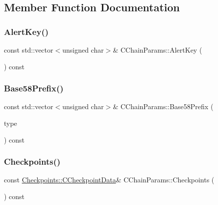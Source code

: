 \subsection{Member Function Documentation}
\mbox{\label{class_c_chain_params_a8ca8fe289d1c3d5851d6aebaf28db22f}} 
\subsubsection{\texorpdfstring{Alert\+Key()}{AlertKey()}}
{\footnotesize\ttfamily const std\+::vector$<$unsigned char$>$\& C\+Chain\+Params\+::\+Alert\+Key (\begin{DoxyParamCaption}{ }\end{DoxyParamCaption}) const\hspace{0.3cm}{\ttfamily [inline]}}

\mbox{\label{class_c_chain_params_a103c58eca4a26a71201882b3ed6c4cb4}} 
\subsubsection{\texorpdfstring{Base58\+Prefix()}{Base58Prefix()}}
{\footnotesize\ttfamily const std\+::vector$<$unsigned char$>$\& C\+Chain\+Params\+::\+Base58\+Prefix (\begin{DoxyParamCaption}\item[{\mbox{\hyperlink{class_c_chain_params_aa294058ec2e3586bd8d03d6c39667058}{Base58\+Type}}}]{type }\end{DoxyParamCaption}) const\hspace{0.3cm}{\ttfamily [inline]}}

\mbox{\label{class_c_chain_params_a818a37d616330e5246a9be4cf8a40813}} 
\subsubsection{\texorpdfstring{Checkpoints()}{Checkpoints()}}
{\footnotesize\ttfamily const \mbox{\hyperlink{struct_checkpoints_1_1_c_checkpoint_data}{Checkpoints\+::\+C\+Checkpoint\+Data}}\& C\+Chain\+Params\+::\+Checkpoints (\begin{DoxyParamCaption}{ }\end{DoxyParamCaption}) const\hspace{0.3cm}{\ttfamily [inline]}}

